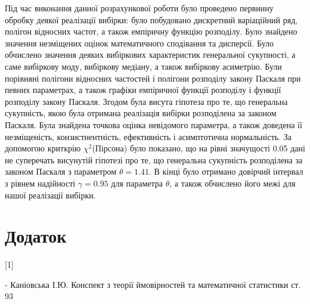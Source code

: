 \documentclass[a5paper, 20pt]{article}
\begin{document}
Під час виконання данної розрахункової роботи було проведено первинну обробку деякої реалізації вибірки: було побудовано дискретний варіаційний ряд, полігон відносних частот, а також емпіричну функцію розподілу. Було знайдено значення незміщених оцінок математичного сподівання та дисперсії. Було обчислено значення деяких вибіркових характеристик генеральної сукупності, а саме вибіркову моду, вибіркову медіану, а також вибіркову асиметрію. Були порівняні полігони відносних частостей і полігони розподілу закону Паскаля при певних параметрах, а також графіки емпіричної функції розподілу і функції розподілу закону Паскаля. Згодом була висута гіпотеза про те, що генеральна сукупність, якою була отримана реалізація вибірки розподілена за законом Паскаля. Була знайдена точкова оцінка невідомого параметра, а також доведена її незміщеність, конзистнентність, ефективність і асимптотична нормальність. За допомогою криткрію $\chi^2$(Пірсона) було показано, що на рівні значущості 0.05 дані не суперечать висунутій гіпотезі про те, що генеральна сукупність розподілена за законом Паскаля з параметром $\theta = 1.41$. В кінці було отримано довірчий інтервал з рівнем надійності $\gamma = 0.95$ для параметра $\theta$, а також обчислено його межі для нашої реалізації вибірки.


\newpage{}

\section*{Додаток}

\hypertarget{d1}{[1]} - Каніовська І.Ю. Конспект з теорії ймовірностей та математичної статистики  ст. 93
\end{document}
